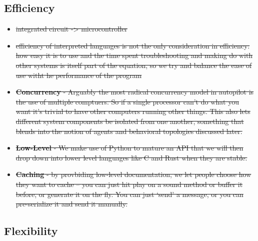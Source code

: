 \subsection{Efficiency}

\begin{itemize}
\item \sout{integrated circuit -> microcontroller}
\item \sout{efficiency of interpreted languages is not the only consideration in efficiency: how easy it is to use and the time spent troubleshooting and making do with other systems is itself part of the equation, so we try and balance the ease of use witht he performance of the program}
\item \sout{\textbf{Concurrency} - Arguably the most radical concurrency model in autopilot is the use of multiple comptuers. So if a single processor can't do what you want it's trivial to have other computers running other things. This also lets different system components be isolated from one another, something that blends into the notion of agents and behavioral topologies discussed later.}
\item \sout{\textbf{Low-Level} - We make use of Python to mature an API that we will then drop down into lower level languages like C and Rust when they are stable.}
\item \sout{\textbf{Caching} - by provbiding low-level documentation, we let people choose how they want to cache -- you can just hit play on a sound method or buffer it before, or generate it on the fly. You can just `send' a message, or you can pre-serialize it and send it manually.}
\end{itemize}

\subsection{Flexibility}

